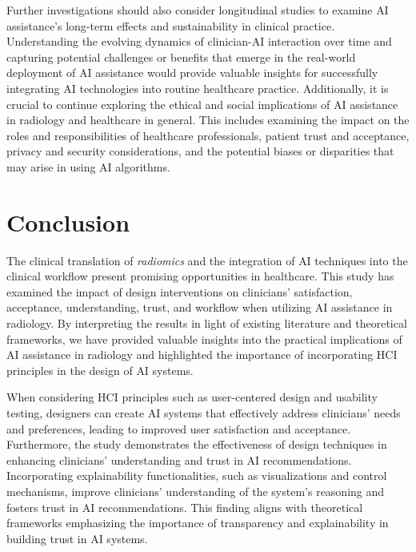 Further investigations should also consider longitudinal studies to examine \ac{AI} assistance's long-term effects and sustainability in clinical practice.
Understanding the evolving dynamics of clinician-\ac{AI} interaction over time and capturing potential challenges or benefits that emerge in the real-world deployment of \ac{AI} assistance would provide valuable insights for successfully integrating \ac{AI} technologies into routine healthcare practice.
Additionally, it is crucial to continue exploring the ethical and social implications of \ac{AI} assistance in radiology and healthcare in general.
This includes examining the impact on the roles and responsibilities of healthcare professionals, patient trust and acceptance, privacy and security considerations, and the potential biases or disparities that may arise in using \ac{AI} algorithms.

\section{Conclusion}
\label{sec:chap005008}

The clinical translation of {\it radiomics} and the integration of \ac{AI} techniques into the clinical workflow present promising opportunities in healthcare.
This study has examined the impact of design interventions on clinicians' satisfaction, acceptance, understanding, trust, and workflow when utilizing \ac{AI} assistance in radiology.
By interpreting the results in light of existing literature and theoretical frameworks, we have provided valuable insights into the practical implications of \ac{AI} assistance in radiology and highlighted the importance of incorporating \ac{HCI} principles in the design of \ac{AI} systems.

When considering \ac{HCI} principles such as user-centered design and usability testing, designers can create \ac{AI} systems that effectively address clinicians' needs and preferences, leading to improved user satisfaction and acceptance.
Furthermore, the study demonstrates the effectiveness of design techniques in enhancing clinicians' understanding and trust in \ac{AI} recommendations.
Incorporating explainability functionalities, such as visualizations and control mechanisms, improve clinicians' understanding of the system's reasoning and fosters trust in \ac{AI} recommendations.
This finding aligns with theoretical frameworks emphasizing the importance of transparency and explainability in building trust in AI systems.

